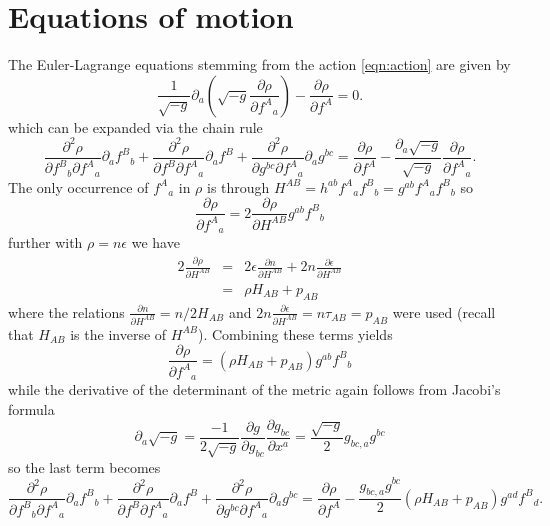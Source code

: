 \section{Equations of motion}
The Euler-Lagrange equations stemming from the action \eqref{eqn:action} are given by
\begin{equation}
\frac{1}{\sqrt{-g}}\partial_a \left(\sqrt{-g}\frac{\partial \rho}{\partial f^A{}_a}\right) - \frac{\partial \rho}{\partial f^A} = 0.
\end{equation}
which can be expanded via the chain rule
\begin{equation}
\frac{\partial^2 \rho}{\partial f^B{}_b \partial f^A{}_a} \partial_a f^B{}_b + \frac{\partial^2 \rho}{\partial f^B \partial f^A{}_a} \partial_a f^B + \frac{\partial^2 \rho}{\partial g^{bc} \partial f^A{}_a } \partial_a g^{bc} = \frac{\partial \rho}{\partial f^A} - \frac{\partial_a \sqrt{-g}}{\sqrt{-g}}\frac{\partial \rho}{\partial f^A{}_a}.
\end{equation}
The only occurrence of $f^A{}_a$ in $\rho$ is through $H^{AB}=h^{ab}f^{A}{}_af^{B}{}_b=g^{ab}f^{A}{}_af^{B}{}_b$ so
\begin{equation}
\frac{\partial \rho}{\partial f^A{}_a} = 2\frac{\partial\rho}{\partial H^{AB}}g^{ab}f^{B}{}_b
\end{equation}
further with $\rho = n\epsilon$ we have
\begin{eqnarray}
2\frac{\partial \rho}{\partial H^{AB}} & = & 2\epsilon\frac{\partial n}{\partial H^{AB}} + 2n\frac{\partial \epsilon}{\partial H^{AB}} \\
& = & \rho H_{AB} + p_{AB}
\end{eqnarray}
where the relations $\frac{\partial n}{\partial H^{AB}} = n/2H_{AB}$ and $2n\frac{\partial \epsilon}{\partial H^{AB}} = n\tau_{AB} = p_{AB}$ were used (recall that $H_{AB}$ is the inverse of $H^{AB}$). Combining these terms yields
\begin{equation}
\frac{\partial \rho}{\partial f^A{}_a} = \left( \rho H_{AB} + p_{AB} \right)g^{ab}f^{B}{}_b
\end{equation}
while the derivative of the determinant of the metric again follows from Jacobi's formula
\begin{equation}
\partial_a \sqrt{-g} = \frac{-1}{2\sqrt{-g}} \frac{\partial g}{\partial g_{bc}}\frac{\partial g_{bc}}{\partial x^a} = \frac{\sqrt{-g}}{2}g_{bc,a}g^{bc}
\end{equation}
so the last term becomes
\begin{equation}
\frac{\partial^2 \rho}{\partial f^B{}_b \partial f^A{}_a} \partial_a f^B{}_b + \frac{\partial^2 \rho}{\partial f^B \partial f^A{}_a} \partial_a f^B + \frac{\partial^2 \rho}{\partial g^{bc} \partial f^A{}_a } \partial_a g^{bc} = \frac{\partial \rho}{\partial f^A} - \frac{g_{bc,a}g^{bc}}{2}\left( \rho H_{AB} + p_{AB} \right)g^{ad}f^{B}{}_d.
\end{equation}
